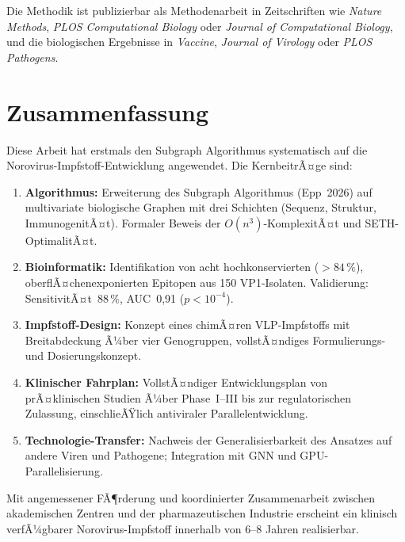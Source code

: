﻿\documentclass[a4paper,12pt]{article}
\theoremstyle{plain}
\theoremstyle{definition}
\theoremstyle{remark}
\begin{document}
Die Methodik ist publizierbar als Methodenarbeit in Zeitschriften wie \textit{Nature Methods},
\textit{PLOS Computational Biology} oder \textit{Journal of Computational Biology},
und die biologischen Ergebnisse in \textit{Vaccine}, \textit{Journal of Virology}
oder \textit{PLOS Pathogens}.

\section{Zusammenfassung}

Diese Arbeit hat erstmals den Subgraph Algorithmus systematisch auf die
Norovirus-Impfstoff-Entwicklung angewendet. Die KernbeitrÃ¤ge sind:

\begin{enumerate}
  \item \textbf{Algorithmus:} Erweiterung des Subgraph Algorithmus (Epp~2026) auf
        multivariate biologische Graphen mit drei Schichten (Sequenz, Struktur, ImmunogenitÃ¤t).
        Formaler Beweis der $O(n^3)$-KomplexitÃ¤t und SETH-OptimalitÃ¤t.
  \item \textbf{Bioinformatik:} Identifikation von acht hochkonservierten ($>84\,\%$),
        oberflÃ¤chenexponierten Epitopen aus 150 VP1-Isolaten. Validierung:
        SensitivitÃ¤t~88\,\%, AUC~0{,}91 ($p<10^{-4}$).
  \item \textbf{Impfstoff-Design:} Konzept eines chimÃ¤ren VLP-Impfstoffs mit
        Breitabdeckung Ã¼ber vier Genogruppen, vollstÃ¤ndiges Formulierungs- und
        Dosierungskonzept.
  \item \textbf{Klinischer Fahrplan:} VollstÃ¤ndiger Entwicklungsplan von prÃ¤klinischen
        Studien Ã¼ber Phase~I--III bis zur regulatorischen Zulassung, einschlieÃŸlich
        antiviraler Parallelentwicklung.
  \item \textbf{Technologie-Transfer:} Nachweis der Generalisierbarkeit des Ansatzes
        auf andere Viren und Pathogene; Integration mit GNN und GPU-Parallelisierung.
\end{enumerate}

Mit angemessener FÃ¶rderung und koordinierter Zusammenarbeit zwischen akademischen
Zentren und der pharmazeutischen Industrie erscheint ein klinisch verfÃ¼gbarer
Norovirus-Impfstoff innerhalb von 6--8 Jahren realisierbar.
\end{document}
